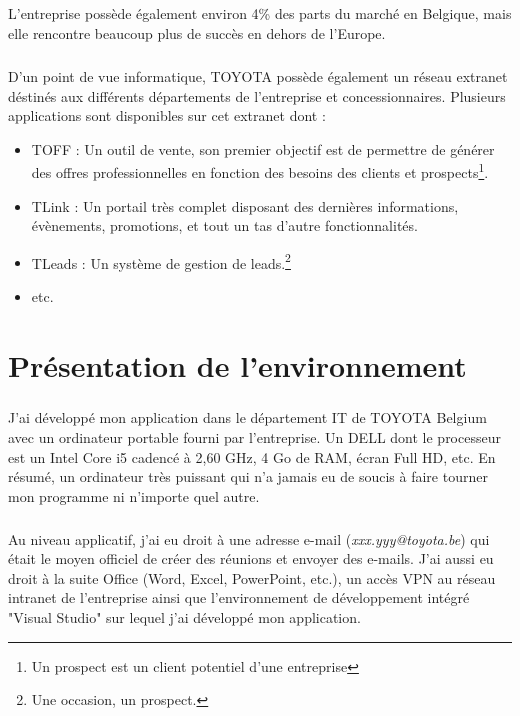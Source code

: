 \documentclass[12pt]{report}
\begin{document}
\paragraph{}
L'entreprise possède également environ 4\% des parts du marché en Belgique, mais elle rencontre beaucoup plus de succès en dehors de l'Europe.

\paragraph{}
D'un point de vue informatique, TOYOTA possède également un réseau extranet déstinés aux différents départements de l'entreprise et concessionnaires. Plusieurs applications sont disponibles sur cet extranet dont :
\begin{itemize}
	\setlength{\itemsep}{5pt} %
	\item TOFF : Un outil de vente, son premier objectif est de permettre de générer des offres professionnelles en fonction des besoins des clients et prospects\footnote{Un prospect est un client potentiel d'une entreprise}. 
	\item TLink : Un portail très complet disposant des dernières informations, évènements, promotions, et tout un tas d'autre fonctionnalités.
	\item TLeads : Un système de gestion de leads.\footnote{Une occasion, un prospect.}
	\item etc.
\end{itemize}
\chapter{Présentation de l'environnement}
\paragraph{}
J'ai développé mon application dans le département IT de TOYOTA Belgium avec un ordinateur portable fourni par l'entreprise. Un DELL dont le processeur est un Intel Core i5 cadencé à 2,60 GHz, 4 Go de RAM, écran Full HD, etc. 
En résumé, un ordinateur très puissant qui n'a jamais eu de soucis à faire tourner mon programme ni n'importe quel autre.

\paragraph{}
Au niveau applicatif, j'ai eu droit à une adresse e-mail (\textit{xxx.yyy@toyota.be}) qui était le moyen officiel de créer des réunions et envoyer des e-mails. 
J'ai aussi eu droit à la suite Office (Word, Excel, PowerPoint, etc.), un accès VPN au réseau intranet de l'entreprise ainsi que l'environnement de développement intégré "Visual Studio" sur lequel j'ai développé mon application.
\end{document}
